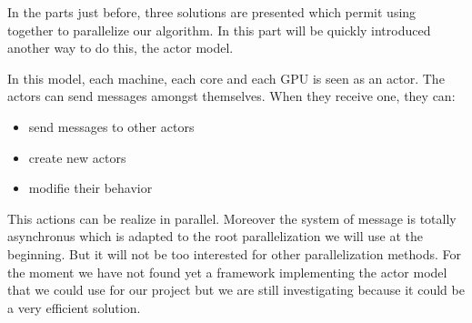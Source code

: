 In the parts just before, three solutions are presented which permit using together to parallelize our algorithm. In this part will be quickly introduced another way to do this, the actor model.

In this model, each machine, each core and each GPU is seen as an actor. The actors can send messages amongst themselves. When they receive one, they can:
\begin{itemize}
\item send messages to other actors
\item create new actors
\item modifie their behavior
\end{itemize}

This actions can be realize in parallel. Moreover the system of message is totally asynchronus which is adapted to the root parallelization we will use at the beginning. But it will not be too interested for other parallelization methods. For the moment we have not found yet a framework implementing the actor model that we could use for our project but we are still investigating because it could be a very efficient solution. 